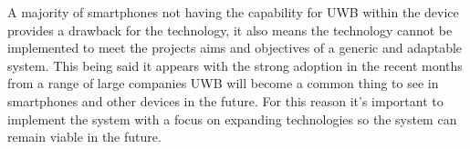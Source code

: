 A majority of smartphones not having the capability for UWB within the device provides a drawback for the technology, it also means the technology cannot be implemented to meet the projects aims and objectives of a generic and adaptable system. This being said it appears with the strong adoption in the recent months from a range of large companies UWB will become a common thing to see in smartphones and other devices in the future. For this reason it's important to implement the system with a focus on expanding technologies so the system can remain viable in the future.\\

